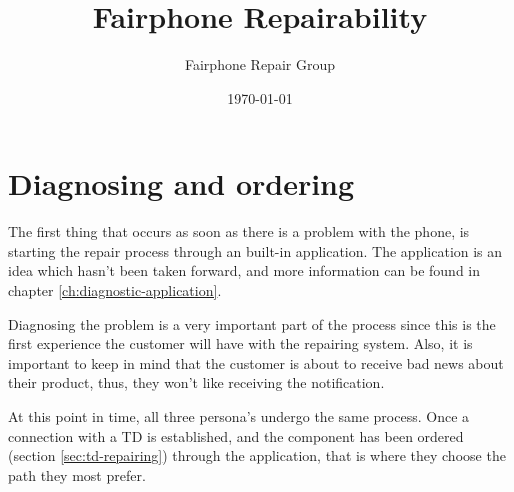 \documentclass[final,a4paper]{report} %
\author{Fairphone Repair Group}
\title{Fairphone Repairability}
\date{\today}
\begin{document}
	\section{Diagnosing and ordering}
	\label{sec:storyboard-diagnosing}
	The first thing that occurs as soon as there is a problem with the phone, is starting the repair process through an built-in application. The application is an idea which hasn't been taken forward, and more information can be found in chapter \ref{ch:diagnostic-application}. 
	
	Diagnosing the problem is a very important part of the process since this is the first experience the customer will have with the repairing system. Also, it is important to keep in mind that the customer is about to receive bad news about their product, thus, they won't like receiving the notification.
	
	At this point in time, all three persona's undergo the same process. Once a connection with a TD is established, and the component has been ordered (section \ref{sec:td-repairing}) through the application, that is where they choose the path they most prefer.
\end{document}
